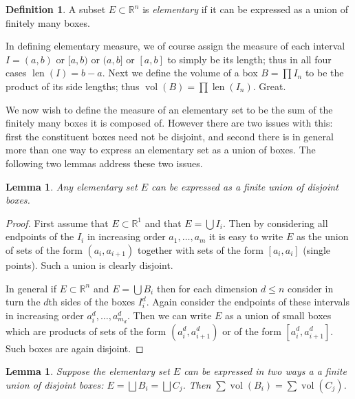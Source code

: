 \documentclass[11pt,oneside]{amsbook}
\newcommand{\RR}{\mathbb R}
\DeclareMathOperator{\len}{len}
\DeclareMathOperator{\vol}{vol}
\theoremstyle{definition}
\theoremstyle{plain}
\newtheorem{lem}[thm]{Lemma}
\theoremstyle{definition}
\newtheorem{defn}[thm]{Definition}
\theoremstyle{remark}
\numberwithin{equation}{section}
\numberwithin{figure}{section}
\begin{document}
\begin{defn}
  A subset $E\subset\RR^n$ is \emph{elementary} if it can be expressed as a union of finitely many boxes.
\end{defn}

In defining elementary measure, we of course assign the measure of each interval $I=(a,b)$ or $[a,b)$ or $(a,b]$ or $[a,b]$ to simply be its length; thus in all four cases $\len(I)=b-a$. Next we define the volume of a box $B=\prod I_n$ to be the product of its side lengths; thus $\vol(B)=\prod\len(I_n)$. Great.

We now wish to define the measure of an elementary set to be the sum of the finitely many boxes it is composed of. However there are two issues with this: first the constituent boxes need not be disjoint, and second there is in general more than one way to express an elementary set as a union of boxes. The following two lemmas address these two issues.

\begin{lem}
  Any elementary set $E$ can be expressed as a finite union of disjoint boxes.
\end{lem}

\begin{proof}
  First assume that $E\subset\RR^1$ and that $E=\bigcup I_i$. Then by considering all endpoints of the $I_i$ in increasing order $a_1,\ldots,a_m$ it is easy to write $E$ as the union of sets of the form $(a_i,a_{i+1})$ together with sets of the form $[a_i,a_i]$ (single points). Such a union is clearly disjoint.

  In general if $E\subset\RR^n$ and $E=\bigcup B_i$ then for each dimension $d\leq n$ consider in turn the $d$th sides of the boxes $I_i^d$. Again consider the endpoints of these intervals in increasing order $a_i^d,\ldots,a_{m_d}^d$. Then we can write $E$ as a union of small boxes which are products of sets of the form $(a_i^d,a_{i+1}^d)$ or of the form $[a_i^d,a_{i+1}^d]$. Such boxes are again disjoint.
\end{proof}

\begin{lem}
  Suppose the elementary set $E$ can be expressed in two ways a a finite union of disjoint boxes: $E=\bigsqcup B_i=\bigsqcup C_j$. Then $\sum\vol(B_i)=\sum\vol(C_j)$.
\end{lem}
\end{document}
